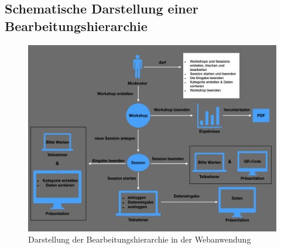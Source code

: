 \subsection{Schematische Darstellung einer Bearbeitungshierarchie}
\begin{figure}[H]
  \centering  
  \includegraphics[scale=0.4]{img/Anforderung.jpeg}
  \caption{Darstellung der Bearbeitungshierarchie in der Webanwendung}
  \label{fig:anforderung}
\end{figure}











